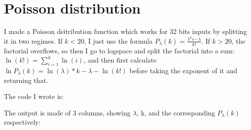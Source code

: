 \section{Poisson distribution}

I made a Poisson dsitribution function which works for 32 bits inputs by splitting it in two regimes.
If $k < 20$, I just use the formula $P_\lambda(k) = \frac{\lambda^k e{-\lambda}}{k!}$.
If $k > 20$, the factorial overflows, so then I go to logspace and split the factorial into a sum: 
$\ln(k!) = \sum_{i=1}^{k} \ln(i)$, and then first calculate $\ln P_\lambda(k) = \ln(\lambda) * k - \lambda - \ln(k!)$ before taking the exponent of it and returning that. 

The code I wrote is:


The output is made of 3 columns, showing $\lambda$, k, and the corresponding $P_\lambda(k)$ respectively:

